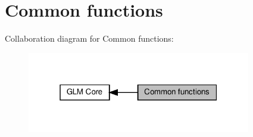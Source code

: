 \hypertarget{group__core__func__common}{}\section{Common functions}
\label{group__core__func__common}
Collaboration diagram for Common functions\+:\nopagebreak
\begin{figure}[H]
\begin{center}
\leavevmode
\includegraphics[width=277pt]{group__core__func__common}
\end{center}
\end{figure}
